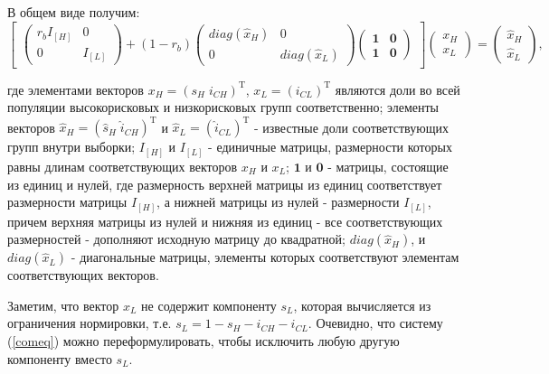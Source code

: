 \documentclass[a4paper]{report}
\begin{document}
	
В общем виде получим:
	\begin{equation}
	\begin{bmatrix}
		\begin{pmatrix}
			r_b I_{\left[ H \right]} & 0\\
			0& I_{\left[ L \right]}
		\end{pmatrix}
		+ (1 - r_b)
		\begin{pmatrix}
			diag(\hat{x}_H) & 0\\
			0& diag(\hat{x}_L)
		\end{pmatrix}
		\begin{pmatrix}
			\textbf{1} & \textbf{0}\\
			\textbf{1} & \textbf{0}
		\end{pmatrix}
	\end{bmatrix}
	\begin{pmatrix}
		x_H\\
		x_L
	\end{pmatrix}
	=
	 \begin{pmatrix}
	 	\hat{x}_H\\
	 	\hat{x}_L
	 \end{pmatrix}, \label{comeq}
	 \end{equation}

	где элементами векторов $x_H = (s_H \; i_{CH})^\mathrm{T}$, $x_L = (i_{CL})^\mathrm{T}$ являются доли во всей популяции высокорисковых и низкорисковых групп соответственно;
	элементы векторов $\hat{x}_H = (\hat{s}_H \; \hat{i}_{CH})^\mathrm{T}$ и $\hat{x}_L = (\hat{i}_{CL})^\mathrm{T}$ - известные доли соответствующих групп внутри выборки;
	$I_{\left[ H \right]}$ и $I_{\left[ L \right]}$ - единичные матрицы, размерности которых равны длинам соответствующих векторов $x_H$ и $x_L$;
	$\textbf{1}$ и $\textbf{0}$ - матрицы, состоящие из единиц и нулей, где размерность верхней матрицы из единиц соответствует размерности матрицы $I_{\left[ H \right]}$, а нижней матрицы из нулей - размерности $I_{\left[ L \right]}$, причем верхняя матрицы из нулей и нижняя из единиц - все соответствующих размерностей - дополняют исходную матрицу до квадратной; $diag(\hat{x}_H)$, и $diag(\hat{x}_L)$ - диагональные матрицы, элементы которых соответствуют элементам соответствующих векторов.
	
	Заметим, что вектор $x_L$ не содержит компоненту $s_L$, которая вычисляется из ограничения нормировки, т.е. $s_L = 1 - s_H - i_{CH} - i_{CL}$. Очевидно, что систему (\ref{comeq}) можно переформулировать, чтобы исключить любую другую компоненту вместо $s_L$.
	
\end{document}
